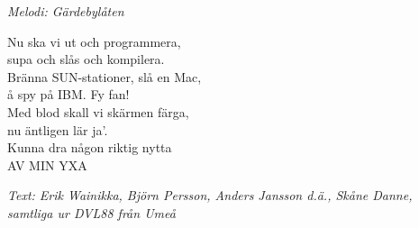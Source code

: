 {\footnotesize\textit{Melodi: Gärdebylåten}}\par
\vspace{10pt}
Nu ska vi ut och programmera,\\
supa och slås och kompilera.\\
Bränna SUN-stationer, slå en Mac,\\
å spy på IBM. Fy fan!\\
Med blod skall vi skärmen färga,\\
nu äntligen lär ja'.\\
Kunna dra någon riktig nytta\\
AV MIN YXA\par
\vspace{10pt}
{\footnotesize\textit{Text: Erik Wainikka, Björn Persson, Anders Jansson d.ä., Skåne Danne, samtliga ur DVL88 från Umeå}}
